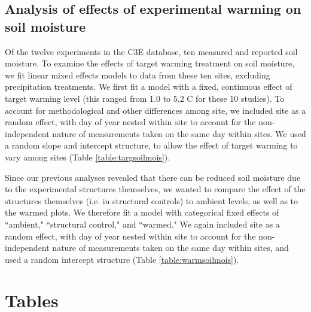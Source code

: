 \documentclass{article}
\begin{document}
\subsection* {Analysis of effects of experimental warming on soil moisture}
Of the twelve experiments in the C3E database, ten measured and reported soil moisture. To examine the effects of target warming treatment on soil moisture, we fit linear mixed effects models to data from these ten sites, excluding precipitation treatments. We first fit a model with a fixed, continuous effect of target warming level (this ranged from 1.0 to 5.2 \degree C for these 10 studies). To account for methodological and other differences among site, we included site as a random effect, with day of year nested within site to account for the non-independent nature of measurements taken on the same day within sites.  We used a random slope and intercept structure, to allow the effect of target warming to vary among sites (Table \ref{table:targsoilmois}). 
\par Since our previous analyses revealed that there can be reduced soil moisture due to the experimental structures themselves, we wanted to compare the effect of the structures themselves (i.e. in structural controls) to ambient levels, as well as to the warmed plots. We therefore fit a model with categorical fixed effects of ``ambient," ``structural control," and ``warmed."  We again included site as a random effect, with day of year nested within site to account for the non-independent nature of measurements taken on the same day within sites, and used a random intercept structure (Table \ref{table:warmsoilmois}). 


\clearpage


\section* {Tables}
\end{document}
